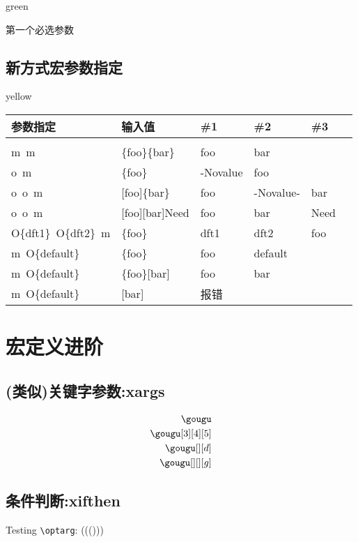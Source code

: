 \documentclass[fontset=windows, 12pt]{article}
\newcommand{\optarg}[1][]{%
    \ifthenelse{\isempty{#1}}%
    {}%
    {(((#1)))}%
}
\begin{document}
\begin{formal}{green}
    \begin{Test}[第一个可选参数][第二个可选参数]{第一个必选参数}
    \end{Test}
\end{formal}

\subsection{新方式宏参数指定}
\begin{formal}[yellow!5]{yellow}
    \begin{center}
        \ttfamily
        \begin{tabular}{l|llllp{8em}}
            参数指定 & 输入值 & \#1 & \#2 & \#3\\
            \hline\\
            m~m & \{foo\}\{bar\} & foo & bar\\
            o~m & \{foo\} & -Novalue & foo\\
            o~o~m & [foo]\{bar\} & foo & -Novalue- & bar\\
            o~o~m & [foo][bar]{Need} & foo & bar & Need\\
            O\{dft1\}~O\{dft2\}~m & \{foo\} & dft1 & dft2 & foo\\
            m~O\{default\} & \{foo\} & foo & default\\
            m~O\{default\} & \{foo\}[bar] & foo & bar\\
            m~O\{default\} & [bar] & 报错
        \end{tabular}
    \end{center}
\end{formal}

\section{宏定义进阶}
\subsection{(类似)关键字参数:xargs}
    \begin{align}
        \gougu\\ 
        \gougu[3][4][5]\\ 
        \gougu[][d]\\ 
        \gougu[][][g] 
    \end{align}

\subsection{条件判断:xifthen}
Testing \verb|\optarg|: \optarg%
\end{document}
